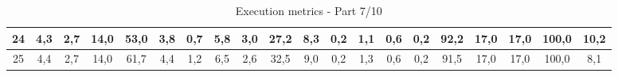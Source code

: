 \begin{sidewaystable}[]
\begin{tabular}{|c|c|c|c|c|c|c|c|c|c|c|c|c|c|c|c|c|c|c|c|}
    24 & 4,3                                              & 2,7                                              & 14,0                                             & 53,0                                             & 3,8                                              & 0,7                                              & 5,8                                              & 3,0                                              & 27,2                                             & 8,3                                              & 0,2                                              & 1,1                                              & 0,6                                              & 0,2                                              & 92,2                                            & 17,0                                            & 17,0                                            & 100,0                                           & 10,2                                            \\ \hline
    25 & 4,4                                              & 2,7                                              & 14,0                                             & 61,7                                             & 4,4                                              & 1,2                                              & 6,5                                              & 2,6                                              & 32,5                                             & 9,0                                              & 0,2                                              & 1,3                                              & 0,6                                              & 0,2                                              & 91,5                                            & 17,0                                            & 17,0                                            & 100,0                                           & 8,1                                             \\ \hline
    \end{tabular}
    \caption{Execution metrics - Part 7/10}
    \label{tab:ap:exec_metrics_7}
\end{sidewaystable}

